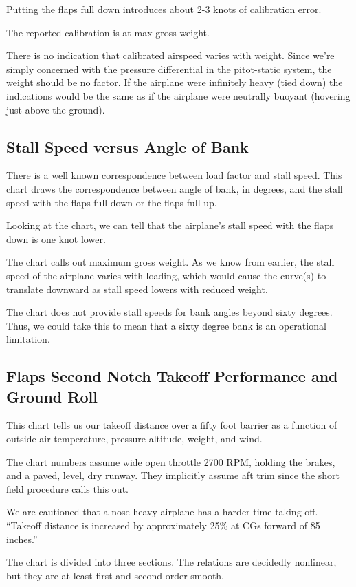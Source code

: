 Putting the flaps full down introduces about 2-3 knots of calibration error.

The reported calibration is at max gross weight.

There is no indication that calibrated airspeed varies with weight. Since we're simply concerned with the pressure differential in the pitot-static system, the weight should be no factor. If the airplane were infinitely heavy (tied down) the indications would be the same as if the airplane were neutrally buoyant (hovering just above the ground).

\subsection{Stall Speed versus Angle of Bank}

There is a well known correspondence between load factor and stall speed. This chart draws the correspondence between angle of bank, in degrees, and the stall speed with the flaps full down or the flaps full up.

Looking at the chart, we can tell that the airplane's stall speed with the flaps down is one knot lower.

The chart calls out maximum gross weight. As we know from earlier, the stall speed of the airplane varies with loading, which would cause the curve(s) to translate downward as stall speed lowers with reduced weight.

The chart does not provide stall speeds for bank angles beyond sixty degrees. Thus, we could take this to mean that a sixty degree bank is an operational limitation.

\subsection{Flaps Second Notch Takeoff Performance and Ground Roll}

This chart tells us our takeoff distance over a fifty foot barrier as a function of outside air temperature, pressure altitude, weight, and wind.

The chart numbers assume wide open throttle 2700 RPM, holding the brakes, and a paved, level, dry runway. They implicitly assume aft trim since the short field procedure calls this out.

We are cautioned that a nose heavy airplane has a harder time taking off. ``Takeoff distance is increased by approximately 25\% at CGs forward of 85 inches.'' 

The chart is divided into three sections. The relations are decidedly nonlinear, but they are at least first and second order smooth.

